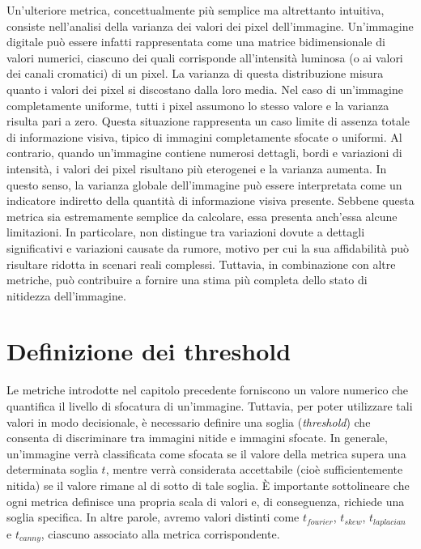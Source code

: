 \documentclass[
    target=bach,
    aauheader=,
    style=
]{thud}
\begin{document}
Un'ulteriore metrica, concettualmente più semplice ma altrettanto intuitiva, consiste nell'analisi della varianza dei valori dei pixel dell'immagine. Un'immagine digitale può essere infatti rappresentata come una matrice bidimensionale di valori numerici, ciascuno dei quali corrisponde all'intensità luminosa (o ai valori dei canali cromatici) di un pixel. La varianza di questa distribuzione misura quanto i valori dei pixel si discostano dalla loro media. Nel caso di un'immagine completamente uniforme, tutti i pixel assumono lo stesso valore e la varianza risulta pari a zero. Questa situazione rappresenta un caso limite di assenza totale di informazione visiva, tipico di immagini completamente sfocate o uniformi. Al contrario, quando un'immagine contiene numerosi dettagli, bordi e variazioni di intensità, i valori dei pixel risultano più eterogenei e la varianza aumenta. In questo senso, la varianza globale dell'immagine può essere interpretata come un indicatore indiretto della quantità di informazione visiva presente. Sebbene questa metrica sia estremamente semplice da calcolare, essa presenta anch'essa alcune limitazioni. In particolare, non distingue tra variazioni dovute a dettagli significativi e variazioni causate da rumore, motivo per cui la sua affidabilità può risultare ridotta in scenari reali complessi. Tuttavia, in combinazione con altre metriche, può contribuire a fornire una stima più completa dello stato di nitidezza dell'immagine.

\chapter{Definizione dei threshold}
\label{cap3}


Le metriche introdotte nel capitolo precedente forniscono un valore numerico che quantifica il livello di sfocatura di un'immagine. Tuttavia, per poter utilizzare tali valori in modo decisionale, è necessario definire una soglia (\textit{threshold}) che consenta di discriminare tra immagini nitide e immagini sfocate. In generale, un'immagine verrà classificata come sfocata se il valore della metrica supera una determinata soglia $t$, mentre verrà considerata accettabile (cioè sufficientemente nitida) se il valore rimane al di sotto di tale soglia. È importante sottolineare che ogni metrica definisce una propria scala di valori e, di conseguenza, richiede una soglia specifica. In altre parole, avremo valori distinti come $t_{fourier}$, $t_{skew}$, $t_{laplacian}$ e $t_{canny}$, ciascuno associato alla metrica corrispondente. 
\end{document}
